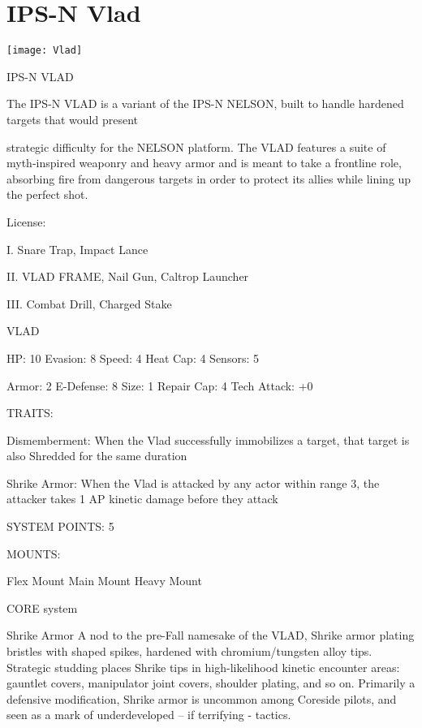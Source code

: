 \section{IPS-N Vlad}

\centering\texttt{[image: Vlad]}

                                                     IPS-N VLAD

The IPS-N VLAD is a variant of the IPS-N NELSON, built to handle hardened targets that would present

strategic difficulty for the NELSON platform. The VLAD features a suite of myth-inspired weaponry and
heavy armor and is meant to take a frontline role, absorbing fire from dangerous targets in order to protect
its allies while lining up the perfect shot.




                                                      License:

I. Snare Trap, Impact Lance

II. VLAD FRAME, Nail Gun, Caltrop Launcher

III. Combat Drill, Charged Stake


                                                       VLAD

  HP: 10          Evasion: 8                              Speed: 4            Heat Cap: 4         Sensors: 5

  Armor: 2        E-Defense: 8                            Size: 1             Repair Cap: 4       Tech Attack:
                                                                                                  +0

                                                      TRAITS:

  Dismemberment: When the Vlad successfully immobilizes a target, that target is also Shredded for the
  same duration

  Shrike Armor: When the Vlad is attacked by any actor within range 3, the attacker takes 1 AP kinetic
  damage before they attack

                                                SYSTEM POINTS: 5

                                                      MOUNTS:

  Flex Mount                          Main Mount                               Heavy Mount

                                                   CORE system

                                                    Shrike Armor
  A nod to the pre-Fall namesake of the VLAD, Shrike armor plating bristles with shaped spikes, hardened
  with chromium/tungsten alloy tips. Strategic studding places Shrike tips in high-likelihood kinetic
  encounter areas: gauntlet covers, manipulator joint covers, shoulder plating, and so on. Primarily a
  defensive modification, Shrike armor is uncommon among Coreside pilots, and seen as a mark of
  underdeveloped -- if terrifying - tactics.

